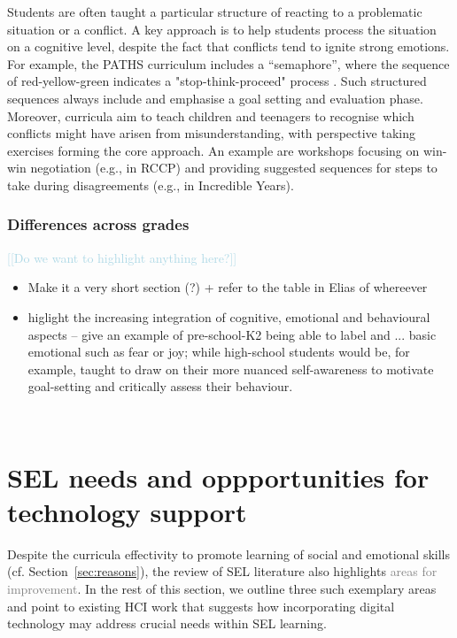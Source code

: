 \documentclass[prodmode,acmtochi]{acmsmall}
\newcommand{\todo}[1]{\textrm{\textrm{\textcolor{LightBlue}{[[#1]]} } } }
\newcommand{\rephrase}[1]{\textrm{\textrm{\textcolor{gray}{#1}}}}
\begin{document}
                
                Students are often taught a particular structure of reacting to a problematic situation or a conflict.
%
A key approach is to help students process the situation on a cognitive level, despite the fact that conflicts tend to ignite strong emotions. For example, the PATHS curriculum includes a ``semaphore'', where the sequence of red-yellow-green indicates a "stop-think-proceed" process \cite{Kam2004,Domitrovich2007}. Such structured sequences always include and emphasise a goal setting and evaluation phase. Moreover, curricula aim to teach children and teenagers to recognise which conflicts might have arisen from misunderstanding, with perspective taking exercises forming the core approach. An example are workshops focusing on win-win negotiation (e.g., in RCCP) and providing suggested sequences for steps to take during disagreements (e.g., in Incredible Years).




\subsubsection{Differences across grades}
\todo{Do we want to highlight anything here?}
\begin{itemize}
	\item Make it a very short section (?) + refer to the table in Elias of whereever 
	\item higlight the increasing integration of cognitive, emotional and behavioural aspects -- give an example of pre-school-K2 being able to label and ... basic emotional such as fear or joy; while high-school students would be, for example, taught to draw on their more nuanced self-awareness to motivate goal-setting and critically assess their behaviour.
\end{itemize}






\vfill ~ \pagebreak
\section{SEL needs and oppportunities for technology support}
\label{sec:HCIsupport}

Despite the curricula effectivity to promote learning of social and emotional skills (cf. Section~\ref{sec:reasons}), the review of SEL literature also highlights \rephrase{areas for improvement}. In the rest of this section, we outline three such exemplary areas and point to existing HCI work that suggests how incorporating digital technology may address crucial needs within SEL learning.
\end{document}
